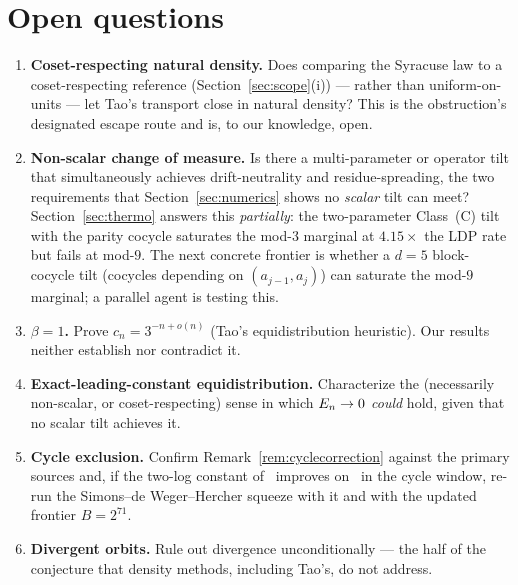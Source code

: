 \documentclass[11pt]{amsart}
\theoremstyle{definition}
\theoremstyle{remark}
\begin{document}
\section{Open questions}
\label{sec:open}

\begin{enumerate}[label=(Q\arabic*)]
\item \textbf{Coset-respecting natural density.} Does comparing the Syracuse law to a coset-respecting
reference (Section~\ref{sec:scope}(i)) --- rather than uniform-on-units --- let Tao's transport close in
natural density? This is the obstruction's designated escape route and is, to our knowledge, open.
\item \textbf{Non-scalar change of measure.} Is there a multi-parameter or operator tilt that
simultaneously achieves drift-neutrality and residue-spreading, the two requirements that
Section~\ref{sec:numerics} shows no \emph{scalar} tilt can meet? Section~\ref{sec:thermo} answers this
\emph{partially}: the two-parameter Class~(C) tilt with the parity cocycle saturates the mod-$3$
marginal at $4.15\times$ the LDP rate but fails at mod-$9$. The next concrete frontier is whether a
$d=5$ block-cocycle tilt (cocycles depending on $(a_{j-1},a_j)$) can saturate the mod-$9$ marginal;
a parallel agent is testing this.
\item \textbf{$\beta=1$.} Prove $c_n=3^{-n+o(n)}$ (Tao's equidistribution heuristic). Our results neither
establish nor contradict it.
\item \textbf{Exact-leading-constant equidistribution.} Characterize the (necessarily non-scalar, or
coset-respecting) sense in which $E_n\to0$ \emph{could} hold, given that no scalar tilt achieves it.
\item \textbf{Cycle exclusion.} Confirm Remark~\ref{rem:cyclecorrection} against the primary sources and,
if the two-log constant of~\citep{laurent2008} improves on~\citep{lmn1995} in the cycle window, re-run the
Simons--de Weger--Hercher squeeze with it and with the updated frontier $B=2^{71}$.
\item \textbf{Divergent orbits.} Rule out divergence unconditionally --- the half of the conjecture that
density methods, including Tao's, do not address.
\end{enumerate}

\end{document}
